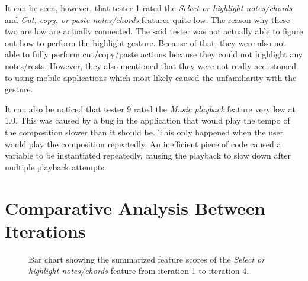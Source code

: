 			It can be seen, however, that tester 1 rated the \textit{Select or highlight notes/chords} and \textit{Cut, copy, or paste notes/chords} features quite low. The reason why these two are low are actually connected. The said tester was not actually able to figure out how to perform the highlight gesture. Because of that, they were also not able to fully perform cut/copy/paste actions because they could not highlight any notes/rests. However, they also mentioned that they were not really accustomed to using mobile applications which most likely caused the unfamiliarity with the gesture. 

			It can also be noticed that tester 9 rated the \textit{Music playback} feature very low at 1.0. This was caused by a bug in the application that would play the tempo of the composition slower than it should be. This only happened when the user would play the composition repeatedly. An inefficient piece of code caused a variable to be instantiated repeatedly, causing the playback to slow down after multiple playback attempts. 
		

	\section{Comparative Analysis Between Iterations} %
	\label{sec:comparative_analysis}

		\begin{figure}[H]
			\centering
		    \caption{Bar chart showing the summarized feature scores of the \textit{Select or highlight notes/chords} feature from iteration 1 to iteration 4.}
		    \label{fig:select-bar}
		\end{figure} 

